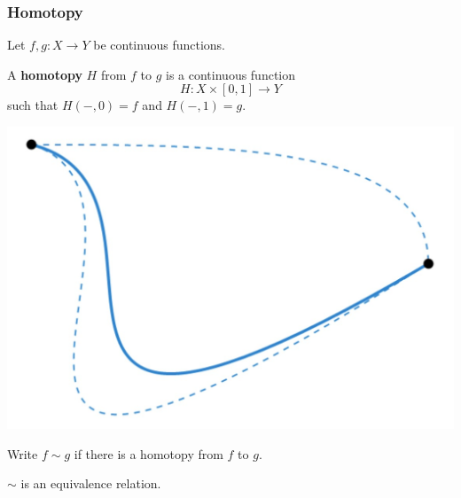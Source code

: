 \documentclass{beamer} %
\begin{document}
\begin{frame}
  \frametitle{Homotopy}

  Let $f, g : X \to Y$ be continuous functions.

  \begin{definition}
    A \textbf{homotopy} $H$ from $f$ to $g$ is a continuous function
    \[
      H : X \times [0, 1] \to Y
    \]
    such that $H(-, 0) = f$ and $H(-, 1) = g$.
  \end{definition}
  
  \begin{center}
    \includegraphics[scale=0.2]{Homotopy.jpg}
  \end{center}

  Write $f \sim g$ if there is a homotopy from $f$ to $g$.

  $\sim$ is an equivalence relation.
\end{frame}

\end{document}
